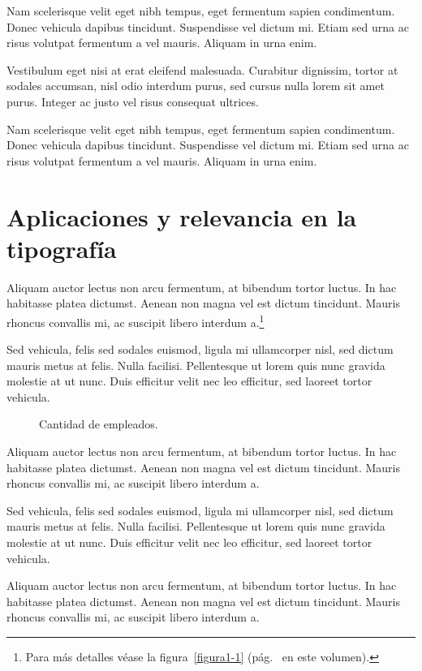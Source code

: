 Nam scelerisque velit eget nibh tempus, eget fermentum sapien condimentum. Donec vehicula dapibus tincidunt. Suspendisse vel dictum mi. Etiam sed urna ac risus volutpat fermentum a vel mauris. Aliquam in urna enim.

Vestibulum eget nisi at erat eleifend malesuada. Curabitur dignissim, tortor at sodales accumsan, nisl odio interdum purus, sed cursus nulla lorem sit amet purus. Integer ac justo vel risus consequat ultrices.

Nam scelerisque velit eget nibh tempus, eget fermentum sapien condimentum. Donec vehicula dapibus tincidunt. Suspendisse vel dictum mi. Etiam sed urna ac risus volutpat fermentum a vel mauris. Aliquam in urna enim.

\section{Aplicaciones y relevancia en la tipografía}

Aliquam auctor lectus non arcu fermentum, at bibendum tortor luctus. In hac habitasse platea dictumst. Aenean non magna vel est dictum tincidunt. Mauris rhoncus convallis mi, ac suscipit libero interdum a.\footnote{Para más detalles véase la figura~\ref{figura1-1} (pág.~\pageref{figura1-1} en este volumen).}

Sed vehicula, felis sed sodales euismod, ligula mi ullamcorper nisl, sed dictum mauris metus at felis. Nulla facilisi. Pellentesque ut lorem quis nunc gravida molestie at ut nunc. Duis efficitur velit nec leo efficitur, sed laoreet tortor vehicula.

\begin{figure}[!ht]
\centering
\begin{bchart}[step=200,max=1000]
\end{bchart}
\caption{Cantidad de empleados.}
\end{figure}

Aliquam auctor lectus non arcu fermentum, at bibendum tortor luctus. In hac habitasse platea dictumst. Aenean non magna vel est dictum tincidunt. Mauris rhoncus convallis mi, ac suscipit libero interdum a.

Sed vehicula, felis sed sodales euismod, ligula mi ullamcorper nisl, sed dictum mauris metus at felis. Nulla facilisi. Pellentesque ut lorem quis nunc gravida molestie at ut nunc. Duis efficitur velit nec leo efficitur, sed laoreet tortor vehicula.

Aliquam auctor lectus non arcu fermentum, at bibendum tortor luctus. In hac habitasse platea dictumst. Aenean non magna vel est dictum tincidunt. Mauris rhoncus convallis mi, ac suscipit libero interdum a.

